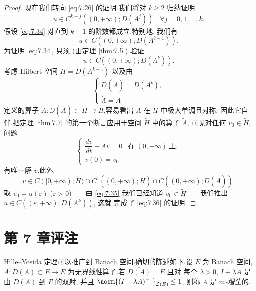 \begin{proof}
现在我们转向 \eqref{eq:7.26} 的证明.我们将对 $k\ge2$ 归纳证明
\begin{equation}
u\in C^{k-j}((0,+\infty);D(A^j))\quad\forall j=0,1,\dots,k.
\label{eq:7.34}
\end{equation}
假设 \eqref{eq:7.34} 对直到 $k-1$ 的阶数都成立.特别地, 我们有
\begin{equation}
u\in C((0,+\infty);D(A^{k-1})).
\label{eq:7.35}
\end{equation}
为证明 \eqref{eq:7.34}, 只须 (由定理  \ref{thm:7.5}) 验证
\begin{equation}
u\in C((0,+\infty);D(A^k)).
\label{eq:7.36}
\end{equation}
考虑 Hilbert 空间 $\tilde H=D(A^{k-1})$ 以及由
\begin{equation*}
\begin{cases}
D(\tilde A)=D(A^k),\\
\tilde A=A
\end{cases}
\end{equation*}
定义的算子 $\tilde A:D(\tilde A)\subset\tilde H\to\tilde H$.容易看出
$\tilde A$ 在 $\tilde H$ 中极大单调且对称; 因此它自伴.把定理  \ref{thm:7.7}
的第一个断言应用于空间 $\tilde H$ 中的算子 $\tilde A$, 可见对任何
$v_0\in\tilde H$, 问题
\begin{equation}
\begin{cases}
\dfrac{dv}{dt}+Av=0 & \text{在}\ (0,+\infty)\ \text{上},\\
v(0)=v_0
\end{cases}
\label{eq:7.37}
\end{equation}
有唯一解 $v$.此外,
\begin{equation*}
v\in C([0,+\infty);\tilde H)\cap C^1((0,+\infty);\tilde H)
\cap C((0,+\infty);D(\tilde A)).
\end{equation*}
取 $v_0=u(\varepsilon)$ ($\varepsilon>0$)——由 \eqref{eq:7.35} 我们已经知道
$v_0\in\tilde H$——我们推出 $u\in C((\varepsilon,+\infty);D(A^k))$, 这就
完成了 \eqref{eq:7.36} 的证明.
\end{proof}

\section*{第 7 章评注}

Hille--Yosida 定理可以推广到 Banach 空间.确切的陈述如下.设 $E$ 为 Banach
空间, $A:D(A)\subset E\to E$ 为无界线性算子.若 $\overline{D(A)}=E$ 且对
每个 $\lambda>0$, $I+\lambda A$ 是由 $D(A)$ 到 $E$ 的双射, 并且
$\norm{(I+\lambda A)^{-1}}_{\LL(E)}\le1$, 则称 $A$ 是 \emph{$m$-增生}的.

